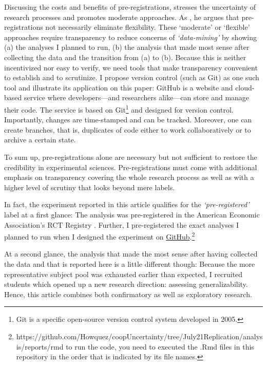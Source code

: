 \documentclass[
  authoryear,
  preprint,
  3p]{elsarticle}
\begin{document}
Discussing the costs and benefits of pre-registrations,
\citet{Olken2015} stresses the uncertainty of research processes and
promotes moderate approaches. As \citet{WaldronAllen2022}, he argues
that pre-registrations not necessarily eliminate flexibility. These
`moderate' or `flexible' approaches require transparency to reduce
concerns of \emph{`data-mining'} \citep[ p.~61]{Olken2015} by showing
(a) the analyses I planned to run, (b) the analysis that made most sense
after collecting the data and the transition from (a) to (b). Because
this is neither incentivized nor easy to verify, we need tools that make
transparency convenient to establish and to scrutinize. I propose
version control (such as Git) as one such tool and illustrate its
application on this paper: GitHub is a website and cloud-based service
where developers---and researchers alike---can store and manage their
code. The service is based on Git\footnote{Git is a specific open-source
  version control system developed in 2005.} and designed for version
control. Importantly, changes are time-stamped and can be tracked.
Moreover, one can create branches, that is, duplicates of code either to
work collaboratively or to archive a certain state.

To sum up, pre-registrations alone are necessary but not sufficient to
restore the credibility in experimental sciences. Pre-registrations must
come with additional emphasis on transparency covering the whole
research process as well as with a higher level of scrutiny that looks
beyond mere labels.

In fact, the experiment reported in this article qualifies for the
\emph{`pre-registered'} label at a first glance: The analysis was
pre-registered in the American Economic Association's RCT Registry
\citep{preregistration}. Further, I pre-registered the exact analyses I
planned to run when I designed the experiment on
\href{https://github.com/Howquez/coopUncertainty/blob/July21Replication/analysis/reports/rmd}{GitHub}.\footnote{https://github.com/Howquez/coopUncertainty/tree/July21Replication/analysis/reports/rmd
  to run the code, you need to executed the .Rmd files in this
  repository in the order that is indicated by its file names.}

At a second glance, the analysis that made the most sense after having
collected the data and that is reported here is a little different
though: Because the more representative subject pool was exhausted
earlier than expected, I recruited students which opened up a new
research direction: assessing generalizability. Hence, this article
combines both confirmatory as well as exploratory research.
\end{document}
